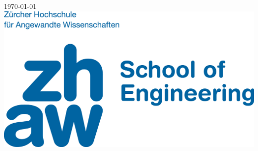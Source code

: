 \begin{titlepage}
	
	
	{\large \today}\\[2cm] %
	
	
	\includegraphics{logo_zhaw.jpg}\\[1cm] %
	
	
	\vfill %
	
\end{titlepage}